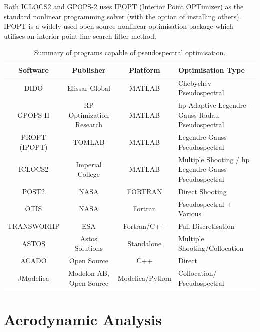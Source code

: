  Both ICLOCS2 and GPOPS-2 uses IPOPT\cite{Wachter2006} (Interior Point OPTimizer) as the standard nonlinear programming solver (with the option of installing others). IPOPT is a widely used open source nonlinear optimisation package which utilises an interior point line search filter method. 

\begin{table}[ht]
	
	\begin{tabular}{|c|c|c| p{4cm}|}
		\hline \textbf{Software} & \textbf{Publisher} & \textbf{Platform} & \textbf{Optimisation Type} \\ 
		\hline DIDO\cite{Ross2002} & Elissar Global & MATLAB & Chebychev Pseudospectral \\ 
		\hline GPOPS II\cite{Rao2010} & RP Optimization Research & MATLAB & hp Adaptive Legendre-Gauss-Radau Pseudospectral \\ 
		\hline PROPT (IPOPT)\cite{Rutquist2010}& TOMLAB & MATLAB & Legendre-Gauss  Pseudospectral  \\ 
		\hline ICLOCS2\cite{iclocs} & Imperial College & MATLAB &  Multiple Shooting / hp Legendre-Gauss Pseudospectral  \\ 
		\hline POST2\cite{WilliamColson} & NASA & FORTRAN & Direct Shooting \\ 
		\hline OTIS\cite{otis} & NASA  & Fortran & Pseudospectral + Various  \\ 
		\hline TRANSWORHP\cite{Wassel2013} & ESA & Fortran/C++ & Full Discretisation \\ 
		\hline ASTOS\cite{astos} & Astos Solutions & Standalone & Multiple Shooting/Collocation  \\  
		\hline ACADO\cite{Houska2011} & Open Source & C++ &  Direct \\  
		\hline JModelica\cite{jmodelica} & Modelon AB, Open Source & Modelica/Python &  Collocation/ Pseudospectral \\  
		
		\hline 
	\end{tabular} 
	
	\caption{Summary of programs capable of pseudospectral optimisation.}
	\label{table:programs}
\end{table}









\section{Aerodynamic Analysis}


